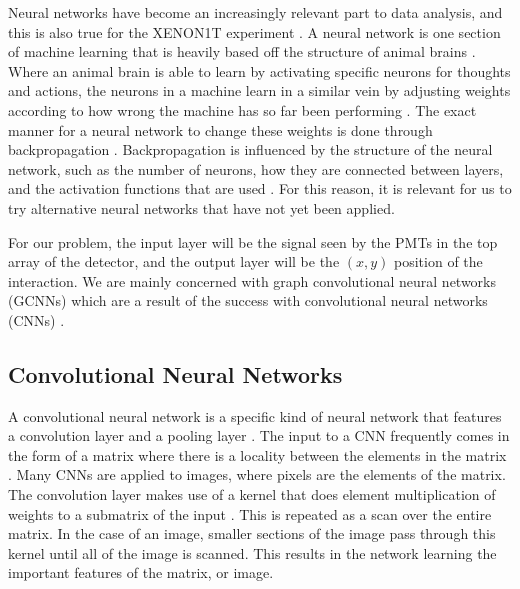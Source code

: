 \documentclass[../thesis.tex]{subfiles}
\begin{document}
Neural networks have become an increasingly relevant part to data analysis, and this is also true for the XENON1T experiment \cite{Bart}.
A neural network is one section of machine learning that is heavily based off the structure of animal brains \cite{deep-learning}.
Where an animal brain is able to learn by activating specific neurons for thoughts and actions, the neurons in a machine learn in a similar vein by adjusting weights according to how wrong the machine has so far been performing \cite{deep-learning}.
The exact manner for a neural network to change these weights is done through backpropagation \cite{deep-learning}.
Backpropagation is influenced by the structure of the neural network, such as the number of neurons, how they are connected between layers, and the activation functions that are used \cite{deep-learning}.
For this reason, it is relevant for us to try alternative neural networks that have not yet been applied.

\par For our problem, the input layer will be the signal seen by the PMTs in the top array of the detector, and the output layer will be the $(x,y)$ position of the interaction.
We are mainly concerned with graph convolutional neural networks (GCNNs) which are a result of the success with convolutional neural networks (CNNs) \cite{GCNN_Kipf}.
\subsection{Convolutional Neural Networks}\label{subsec:CNN}
A convolutional neural network is a specific kind of neural network that features a convolution layer and a pooling layer \cite{deep-learning}.
The input to a CNN frequently comes in the form of a matrix where there is a locality between the elements in the matrix \cite{deep-learning}.
Many CNNs are applied to images, where pixels are the elements of the matrix.
The convolution layer makes use of a kernel that does element multiplication of weights to a submatrix of the input \cite{deep-learning}.
This is repeated as a scan over the entire matrix.
In the case of an image, smaller sections of the image pass through this kernel until all of the image is scanned.
This results in the network learning the important features of the matrix, or image.
\end{document}
